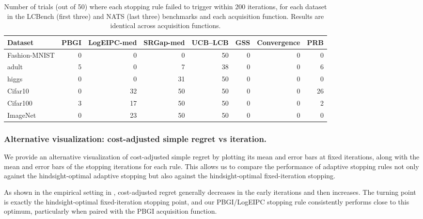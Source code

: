 \begin{table}[t]
\centering
\caption{Number of trials (out of 50) where each stopping rule failed to trigger within 200 iterations, for each dataset in the LCBench (first three) and NATS (last three) benchmarks and each acquisition function. Results are identical across acquisition functions.}
\label{tab:nonstops}
\small
\begin{tabular}{@{}lrrrrrrr@{}}
\toprule
\textbf{Dataset} &
\textbf{PBGI} & \textbf{LogEIPC-med} & \textbf{SRGap-med} & \textbf{UCB–LCB} & \textbf{GSS} & \textbf{Convergence} & \textbf{PRB} \\
\midrule
Fashion-MNIST & 0 & 0 & 0 & 50 & 0 & 0 & 0 \\
adult & 5 & 0 & 7 & 38 & 0 & 0 & 6 \\
higgs & 0 & 0 & 31 & 50 & 0 & 0 & 0 \\
\midrule
Cifar10 & 0 & 32 & 50 & 50 & 0 & 0 & 26 \\
Cifar100 & 3 & 17 & 50 & 50 & 0 & 0 & 2 \\
ImageNet & 0 & 23 & 50 & 50 & 0 & 0 & 0    \\
\bottomrule
\end{tabular}
\end{table}



\subsubsection{Alternative visualization: cost-adjusted simple regret vs iteration.}
We provide an alternative visualization of cost-adjusted simple regret by plotting its mean and error bars at fixed iterations, along with the mean and error bars of the stopping iterations for each rule. This allows us to compare the performance of adaptive stopping rules not only against the hindsight-optimal adaptive stopping but also against the hindsight-optimal fixed-iteration stopping.

As shown in the empirical setting in , cost-adjusted regret generally decreases in the early iterations and then increases. The turning point is exactly the hindsight-optimal fixed-iteration stopping point, and our PBGI/LogEIPC stopping rule consistently performs close to this optimum, particularly when paired with the PBGI acquisition function.

